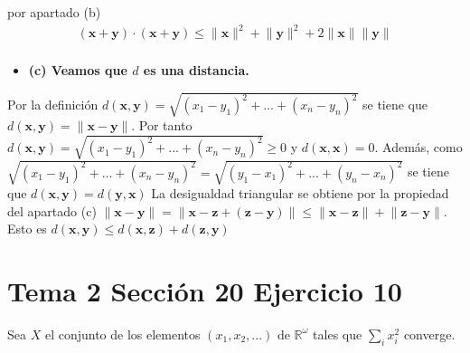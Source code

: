 \documentclass{article}
\newcommand{\vect}[1]{\boldsymbol{#1}}
\begin{document}
por apartado (b)
\begin{eqnarray}
(\vect{x}+\vect{y})\cdot(\vect{x}+\vect{y})\leq \lVert \vect{x}\rVert^2 +\lVert \vect{y}\rVert^2+2\lVert \vect{x}\rVert \lVert \vect{y}\rVert\nonumber\\
\end{eqnarray}
\begin{itemize}
\item \bf (c) \rm Veamos que $d$ es una distancia.
\end{itemize}
Por la definición $d(\vect{x},\vect{y})=\sqrt{(x_1-y_1)^2+...+(x_n-y_n)^2}$ se tiene que $d(\vect{x},\vect{y})=\lVert \vect{x}-\vect{y}\rVert$. Por tanto $d(\vect{x},\vect{y})=\sqrt{(x_1-y_1)^2+...+(x_n-y_n)^2}\geq 0$ y $d(\vect{x},\vect{x})=0$. Además, como $\sqrt{(x_1-y_1)^2+...+(x_n-y_n)^2}=\sqrt{(y_1-x_1)^2+...+(y_n-x_n)^2}$ se tiene que $d(\vect{x},\vect{y})=d(\vect{y},\vect{x})$
La desigualdad triangular se obtiene por la propiedad del apartado (c) $\lVert \vect{x}-\vect{y}\rVert= \lVert \vect{x}-\vect{z}+(\vect{z}-\vect{y})\rVert\leq \lVert \vect{x}-\vect{z}\rVert +\lVert \vect{z}-\vect{y}\rVert$. Esto es $d(\vect{x},\vect{y})\leq d(\vect{x},\vect{z})+d(\vect{z},\vect{y})$
\section{Tema 2 Sección 20 Ejercicio 10}
Sea $X$ el conjunto de los elementos $(x_1,x_2,...)$ de $\mathbb{R}^\omega$ tales que $\sum_ix_i^2$ converge. 
\end{document}
